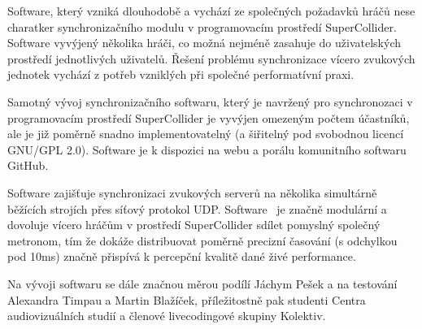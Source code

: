 \documentclass[11pt]{article} %
\begin{document}
Software, který vzniká dlouhodobě a vychází ze společných požadavků hráčů nese charatker synchronizačního modulu v programovacím prostředí SuperCollider. Software vyvýjený několika hráči, co možná nejméně zasahuje do uživatelských prostředí jednotlivých uživatelů. Řešení problému synchronizace vícero zvukových jednotek vychází z potřeb vzniklých při společné performatívní praxi.

Samotný vývoj synchronizačního softwaru, který je navržený pro synchronozaci v programovacím prostředí SuperCollider je vyvýjen omezeným počtem účastníků, ale je již poměrně snadno implementovatelný (a šiřitelný pod svobodnou licencí GNU/GPL 2.0). Software je k dispozici na webu a porálu komunitního softwaru GitHub.

Software zajišťuje synchronizaci zvukových serverů na několika simultárně běžících strojích přes síťový protokol UDP. Software \ je značně modulární a dovoluje vícero hráčům v prostředí SuperCollider sdílet  pomyslný  společný metronom, tím že dokáže distribuovat poměrně precizní časování (s odchylkou pod 10ms) značně přispívá k percepční kvalitě dané živé performance. 

Na vývoji softwaru se dále značnou měrou podílí Jáchym Pešek a na testování Alexandra Timpau a Martin Blažíček, příležitostně pak studenti Centra audiovizuálních studií a členové livecodingové skupiny Kolektiv.


\end{document}
